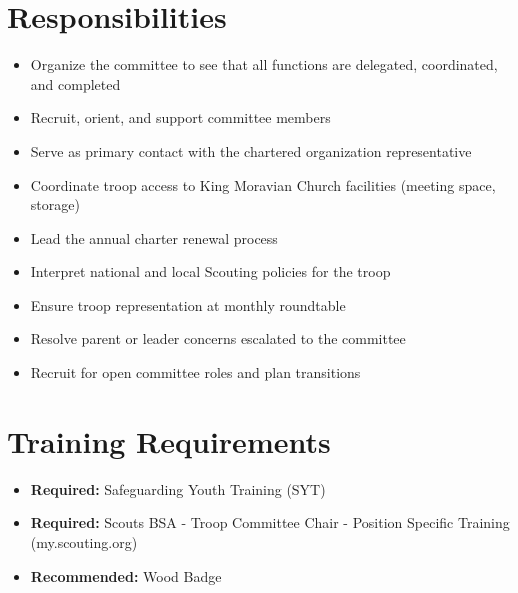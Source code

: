 \documentclass[10pt, letterpaper]{article}
\begin{document}
\begin{minipage}[t]{0.48\linewidth}
\raggedright

\section{Responsibilities}
\begin{itemize}
  \item Organize the committee to see that all functions are delegated, coordinated, and completed
  \item Recruit, orient, and support committee members
  \item Serve as primary contact with the chartered organization representative
  \item Coordinate troop access to King Moravian Church facilities (meeting space, storage)
  \item Lead the annual charter renewal process
  \item Interpret national and local Scouting policies for the troop
  \item Ensure troop representation at monthly roundtable
  \item Resolve parent or leader concerns escalated to the committee
  \item Recruit for open committee roles and plan transitions
\end{itemize}

\section{Training Requirements}
\begin{itemize}
  \item \textbf{Required:} Safeguarding Youth Training (SYT)
  \item \textbf{Required:} Scouts BSA - Troop Committee Chair - Position Specific Training (my.scouting.org)
  \item \textbf{Recommended:} Wood Badge
\end{itemize}

\end{minipage}
\hfill
\end{document}
